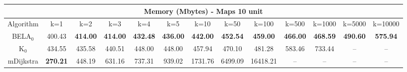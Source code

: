 \begin{tabular}{c|cccccccccccc}\toprule
\multicolumn{13}{c}{Memory (Mbytes) - Maps 10 unit}\\ \midrule
Algorithm & k=1 & k=2 & k=3 & k=4 & k=5 & k=10 & k=50 & k=100 & k=500 & k=1000 & k=5000 & k=10000 \\ \midrule
BELA$_0$ & 400.43 & \textbf{414.00} & \textbf{414.00} & \textbf{432.48} & \textbf{436.00} & \textbf{442.00} & \textbf{452.54} & \textbf{459.00} & \textbf{466.00} & \textbf{468.59} & \textbf{490.60} & \textbf{575.94} \\
K$_0$ & 434.55 & 435.58 & 440.51 & 448.00 & 448.00 & 457.94 & 470.10 & 481.28 & 583.46 & 733.44 & -- & -- \\
mDijkstra & \textbf{270.21} & 448.19 & 631.16 & 737.31 & 939.02 & 1731.76 & 6499.09 & 16418.21 & -- & -- & -- & -- \\ \bottomrule 
\end{tabular}
